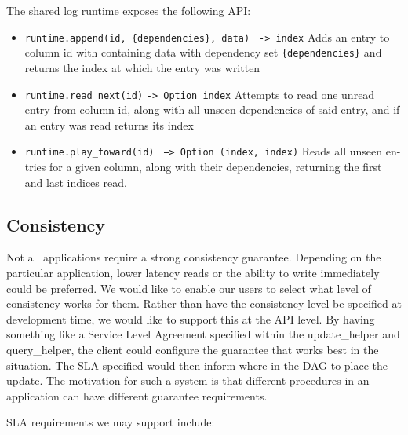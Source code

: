 \documentclass[letterpaper,twocolumn,10pt]{article}
\begin{document}
The shared log runtime exposes the following API:

\begin{itemize}

\item \verb_runtime.append(id, {dependencies}, data)_ \verb_ -> index_ Adds an entry to column id with containing data with dependency set \verb_{dependencies}_ and returns the index at which the entry was written

\item \verb~runtime.read_next(id)~ \verb~-> Option index~ Attempts to read one unread entry from column id, along with all unseen dependencies of said entry, and if an entry was read returns its index

\item \verb~runtime.play_foward(id)~ \verb~ −> Option (index, index)~ Reads all unseen en- tries for a given column, along with their dependencies, returning the first and last indices read.

\end{itemize}


\subsection{Consistency}

Not all applications require a strong consistency guarantee. Depending on the particular application, lower latency reads or the ability to write immediately could be preferred. We would like to enable our users to select what level of consistency works for them. Rather than have the consistency level be specified at development time, we would like to support this at the API level. By having something like a Service Level Agreement specified within the update\_helper and query\_helper, the client could configure the guarantee that works best in the situation. The SLA specified would then inform where in the DAG to place the update. The motivation for such a system is that different procedures in an application can have different guarantee requirements.

SLA requirements we may support include: \cite{SLA}
\end{document}
